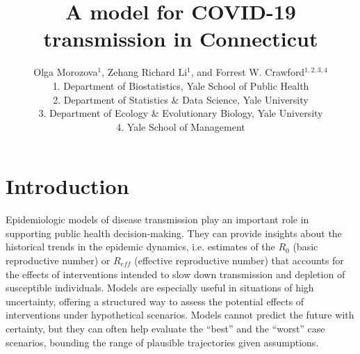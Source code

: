\documentclass[11pt]{article}
\title{A model for COVID-19 transmission in Connecticut}
\author{Olga Morozova$^{1}$,
  Zehang Richard Li$^1$,
and Forrest W. Crawford$^{1,2,3,4}$  \\[1em]
\small 1. Department of Biostatistics, Yale School of Public Health \\
\small 2. Department of Statistics \& Data Science, Yale University \\
\small 3. Department of Ecology \& Evolutionary Biology, Yale University \\
\small 4. Yale School of Management }
\newcommand{\comments}[1]{[\textcolor{red}{#1}]}
\begin{document}
\maketitle




\section{Introduction}




Epidemiologic models of disease transmission play an important role in supporting public health decision-making. They can provide insights about the historical trends in the epidemic dynamics, i.e. estimates of the $R_0$ (basic reproductive number) or $R_{eff}$ (effective reproductive number) that accounts for the effects of interventions intended to slow down transmission and depletion of susceptible individuals.
Models are especially useful in situations of high uncertainty, offering a structured way to assess the potential effects of interventions under hypothetical scenarios. Models cannot predict the future with certainty, but they can often help evaluate the ``best'' and the ``worst'' case scenarios, bounding the range of plausible trajectories given assumptions. 
\end{document}

